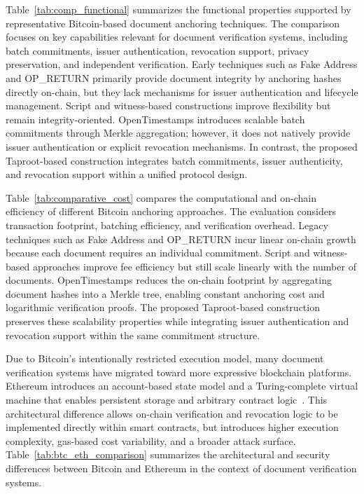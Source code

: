 \documentclass[preprint,12pt]{elsarticle}
\begin{document}
Table~\ref{tab:comp_functional} summarizes the functional properties supported by representative Bitcoin-based document anchoring techniques. 
The comparison focuses on key capabilities relevant for document verification systems, including batch commitments, issuer authentication, revocation support, privacy preservation, and independent verification. 
Early techniques such as Fake Address and OP\_RETURN primarily provide document integrity by anchoring hashes directly on-chain, but they lack mechanisms for issuer authentication and lifecycle management. 
Script and witness-based constructions improve flexibility but remain integrity-oriented. 
OpenTimestamps introduces scalable batch commitments through Merkle aggregation; however, it does not natively provide issuer authentication or explicit revocation mechanisms. 
In contrast, the proposed Taproot-based construction integrates batch commitments, issuer authenticity, and revocation support within a unified protocol design.



Table~\ref{tab:comparative_cost} compares the computational and on-chain efficiency of different Bitcoin anchoring approaches. 
The evaluation considers transaction footprint, batching efficiency, and verification overhead. 
Legacy techniques such as Fake Address and OP\_RETURN incur linear on-chain growth because each document requires an individual commitment. 
Script and witness-based approaches improve fee efficiency but still scale linearly with the number of documents. 
OpenTimestamps reduces the on-chain footprint by aggregating document hashes into a Merkle tree, enabling constant anchoring cost and logarithmic verification proofs. 
The proposed Taproot-based construction preserves these scalability properties while integrating issuer authentication and revocation support within the same commitment structure.



Due to Bitcoin’s intentionally restricted execution model, many document verification systems have migrated toward more expressive blockchain platforms. Ethereum introduces an account-based state model and a Turing-complete virtual machine that enables persistent storage and arbitrary contract logic~\cite{buterin2014ethereum}. This architectural difference allows on-chain verification and revocation logic to be implemented directly within smart contracts, but introduces higher execution complexity, gas-based cost variability, and a broader attack surface. Table~\ref{tab:btc_eth_comparison} summarizes the architectural and security differences between Bitcoin and Ethereum in the context of document verification systems.
\end{document}
